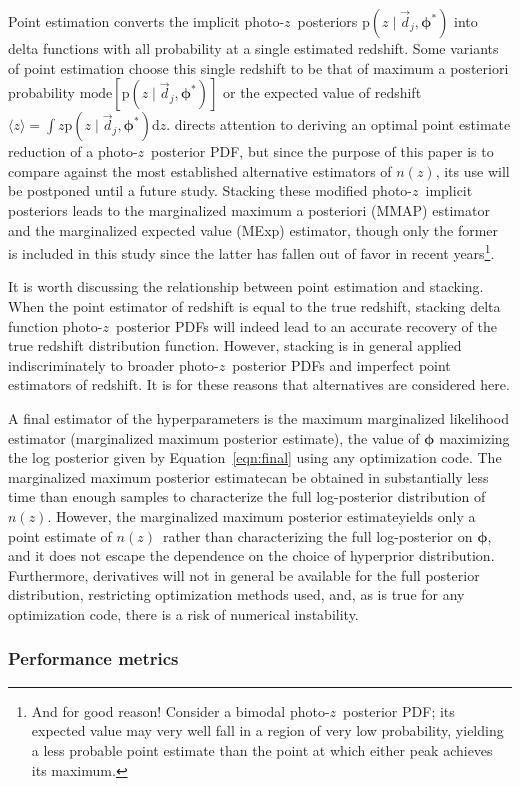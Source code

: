 \documentclass[iop]{emulateapj}
\newcommand{\Eq}[1]{Equation~\ref{#1}}
\newcommand{\data}{\ensuremath{\vec{d}}}
\newcommand{\pr}[1]{\ensuremath{\mathrm{p}(#1)}}
\newcommand{\gvn}{\mid}
\newcommand{\integral}[2]{\ensuremath{\int #1 \mathrm{d} #2}}
\newcommand{\pz}{photo-$z$}
\newcommand{\pzpdf}{\pz\ posterior PDF}
\newcommand{\pzip}{\pz\ implicit posterior}
\newcommand{\nz}{$n(z)$}
\newcommand{\bvec}[1]{\ensuremath{\boldsymbol{#1}}}
\newcommand{\ndphi}{\bvec{\phi}}
\newcommand{\mmle}{marginalized maximum posterior estimate}
\begin{document}
Point estimation converts the implicit \pz\ posteriors $\pr{z \gvn \data_{j}, \ndphi^{*}}$ into delta functions with all probability at a single estimated redshift.  
Some variants of point estimation choose this single redshift to be that of maximum a posteriori probability $\mathrm{mode}[\pr{z \gvn \data_{j}, \ndphi^{*}}]$ or the expected value of redshift $\langle z \rangle = \integral{z \pr{z \gvn \data_{j}, \ndphi^{*}}}{z}$.
\citet{tanaka_photometric_2018} directs attention to deriving an optimal point estimate reduction of a \pzpdf, but since the purpose of this paper is to compare against the most established alternative estimators of \nz, its use will be postponed until a future study.
Stacking these modified \pzip s leads to the marginalized maximum a posteriori (MMAP) estimator and the marginalized expected value (MExp) estimator, though only the former is included in this study since the latter has fallen out of favor in recent years\footnote{And for good reason!  Consider a bimodal \pzpdf; its expected value may very well fall in a region of very low probability, yielding a less probable point estimate than the point at which either peak achieves its maximum.}.

It is worth discussing the relationship between point estimation and stacking.  
When the point estimator of redshift is equal to the true redshift, stacking delta function \pzpdf s will indeed lead to an accurate recovery of the true redshift distribution function.  
However, stacking is in general applied indiscriminately to broader \pzpdf s and imperfect point estimators of redshift.  
It is for these reasons that alternatives are considered here.

A final estimator of the hyperparameters is the maximum marginalized likelihood estimator (\mmle), the value of $\ndphi$ maximizing the log posterior given by \Eq{eqn:final} using any optimization code. 
The \mmle can be obtained in substantially less time than enough samples to characterize the full log-posterior distribution of \nz.
However, the \mmle yields only a point estimate of \nz\ rather than characterizing the full log-posterior on $\ndphi$, and it does not escape the dependence on the choice of hyperprior distribution.  
Furthermore, derivatives will not in general be available for the full posterior distribution, restricting optimization methods used, and, as is true for any optimization code, there is a risk of numerical instability.

\subsubsection{Performance metrics}
\label{sec:diag}
\end{document}
